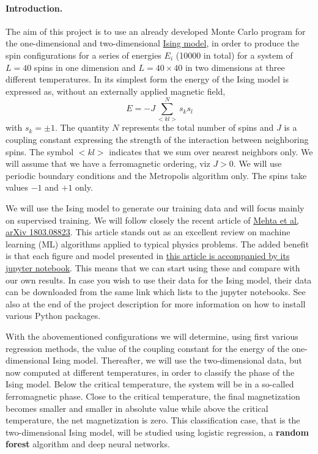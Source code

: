 \documentclass[%
oneside,                 %
final,                   %
10pt]{article}
\begin{document}
\paragraph{Introduction.}
The aim of this project is to use an already developed Monte Carlo program for the one-dimensional and two-dimensional \href{{https://github.com/CompPhysics/MachineLearning/tree/master/doc/Programs/IsingModel}}{Ising model}, in order to produce the spin configurations for a series of energies $E_i$ (10000 in total) for a system of $L=40$ spins in one dimension and $L=40\times 40$ in two dimensions at three different temperatures.
In its simplest form the energy of the Ising model is expressed as, without an externally applied magnetic field, 
\[
E=-J\sum_{< kl >}^{N}s_ks_l 
\]
with
$s_k=\pm 1$. The quantity $N$ represents the total number of spins and $J$ is a coupling
constant expressing the strength of the interaction between
neighboring spins.  The symbol $<kl>$ indicates that we sum over
nearest neighbors only. We will assume that we have a ferromagnetic
ordering, viz $J> 0$.  We will use periodic boundary conditions and
the Metropolis algorithm only. The spins take values $-1$ and $+1$ only. 


We will use the Ising model to generate our training data and will focus mainly on supervised training. We will follow closely the recent article of \href{{https://arxiv.org/abs/1803.08823}}{Mehta et al, arXiv 1803.08823}. This article stands out as an excellent review on machine learning (ML) algorithms applied to typical physics problems. The added benefit is that each figure and model presented in \href{{https://physics.bu.edu/~pankajm/MLnotebooks.html}}{this article is accompanied by its jupyter notebook}. This means that we can start using these and compare with our own results. In case you wish to use their data for the Ising model, their data can be downloaded from the same link which lists to the jupyter notebooks. See also at the end of the project description for more information on how to install various Python packages. 



With the abovementioned  configurations we will determine, using first various
regression methods, the value of the coupling constant for the energy
of the one-dimensional Ising model. Thereafter, we will use the
two-dimensional data, but now computed at different temperatures, in
order to classify the phase of the Ising model. Below the critical
temperature, the system will be in a so-called ferromagnetic
phase. Close to the critical temperature, the final magnetization becomes smaller and smaller in absolute value
 while above the critical temperature,
the net magnetization is zero.  This classification  case, that is the
two-dimensional Ising model, will be studied using logistic regression, a \textbf{random forest}
algorithm and deep neural networks.
\end{document}
